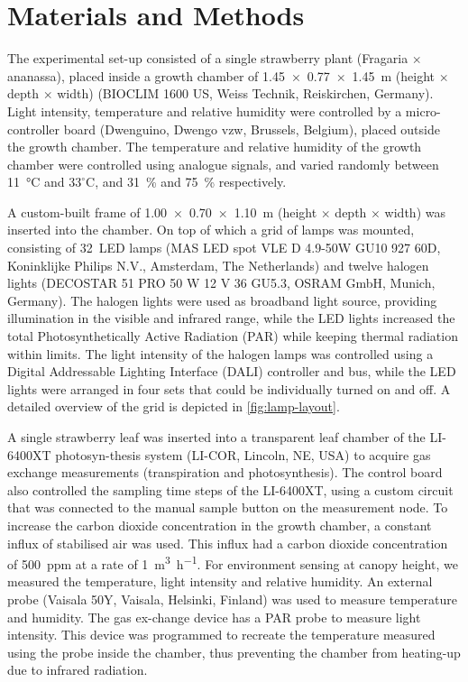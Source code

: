 \documentclass[10pt,authoryear,a4paper,review]{elsarticle}
\begin{document}
\section{Materials and Methods}
    
    The experimental set-up consisted of a single strawberry plant (Fragaria $\times$ ananassa), placed inside a growth chamber of \SI{1.45 x 0.77 x 1.45}{\metre} (height $\times$ depth $\times$ width) (BIOCLIM 1600 US, Weiss Technik, Reiskirchen, Germany). Light intensity, temperature and relative humidity were controlled by a micro-controller board (Dwenguino, Dwengo vzw, Brussels, Belgium), placed outside the growth chamber. The temperature and relative humidity of the growth chamber were controlled using analogue signals, and varied randomly between \SI{11}{\celsius} and $33^{\circ}\text{C}$, and \SI{31}{\percent} and \SI{75}{\%} respectively. 
    
    A custom-built frame of \SI{1.00 x 0.70 x 1.10}{m} (height $\times$ depth $\times$ width) was inserted into the chamber. On top of which a grid of lamps was mounted, consisting of 32~LED lamps (MAS LED spot VLE D 4.9-50W GU10 927 60D, Koninklijke Philips N.V., Amsterdam, The Netherlands) and twelve halogen lights (DECOSTAR 51 PRO 50 W 12 V 36 GU5.3, OSRAM GmbH, Munich, Germany). The halogen lights were used as broadband light source, providing illumination in the visible and infrared range, while the LED lights increased the total Photosynthetically Active Radiation (PAR) while keeping thermal radiation within limits. The light intensity of the halogen lamps was controlled using a Digital Addressable Lighting Interface (DALI) controller and bus, while the LED lights were arranged in four sets that could be individually turned on and off. A detailed overview of the grid is depicted in \cref{fig:lamp-layout}. 
    
    A single strawberry leaf was inserted into a transparent leaf chamber of the LI-6400XT photosyn-thesis system (LI-COR, Lincoln, NE, USA) to acquire gas exchange measurements (transpiration and photosynthesis). The control board also controlled the sampling time steps of the LI-6400XT, using a custom circuit that was connected to the manual sample button on the measurement node. To increase the carbon dioxide concentration in the growth chamber, a constant influx of stabilised air was used. This influx had a carbon dioxide concentration of \SI{500}{ppm} at a rate of \SI{1}{\cubic\metre\per\hour}. For environment sensing at canopy height, we measured the temperature, light intensity and relative humidity. An external probe (Vaisala 50Y, Vaisala, Helsinki, Finland) was used to measure temperature and humidity. The gas ex-change device has a PAR probe to measure light intensity. This device was programmed to recreate the temperature measured using the probe inside the chamber, thus preventing the chamber from heating-up due to infrared radiation. 
    
\end{document}
